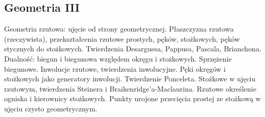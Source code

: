 \subsection{Geometria III}
Geometria rzutowa: ujęcie od strony geometrycznej. Płaszczyzna rzutowa (rzeczywista), przekształcenia rzutowe prostych, pęków, stożkowych, pęków stycznych do stożkowych.
Twierdzenia Desarguesa, Pappusa, Pascala, Brianchona.
Dualność: biegun i biegunowa względem okręgu i stożkowych. Sprzężenie biegunowe. Inwolucje rzutowe, twierdzenia inwolucyjne. Pęki okręgów i stożkowych jako generatory inwolucji. Twierdzenie Ponceleta. Stożkowe w ujęciu rzutowym, twierdzenia Steinera i Braikenridge'a-Maclaurina. Rzutowe określenie ogniska i kierownicy stożkowych. Punkty urojone przecięcia prostej ze stożkową w ujęciu czysto geometrycznym.
